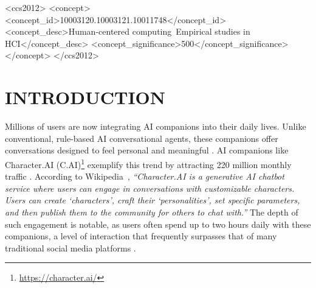 \documentclass[sigconf, nonacm]{acmart}
\begin{document}
\begin{CCSXML}
<ccs2012>
<concept>
<concept_id>10003120.10003121.10011748</concept_id>
<concept_desc>Human-centered computing~Empirical studies in HCI</concept_desc>
<concept_significance>500</concept_significance>
</concept>
</ccs2012>
\end{CCSXML}




\maketitle

\section{INTRODUCTION}
Millions of users are now integrating AI companions into their daily lives. Unlike conventional, rule-based AI conversational agents, these companions offer conversations designed to feel personal and meaningful \cite{CommonSense2025}. AI companions like Character.AI (C.AI)\footnote{\url{https://character.ai/}} exemplify this trend by attracting 220 million monthly traffic \cite{Curry2025, Kia2025}. According to Wikipedia~\cite{noauthor_character.ai_2025}, \textit{``Character.AI is a generative AI chatbot service where users can engage in conversations with customizable characters. Users can create `characters', craft their `personalities', set specific parameters, and then publish them to the community for others to chat with.''} The depth of such engagement is notable, as users often spend up to two hours daily with these companions, a level of interaction that frequently surpasses that of many traditional social media platforms \cite{Ayengar2025, Roza2025, Ronik2024}.
\end{document}
